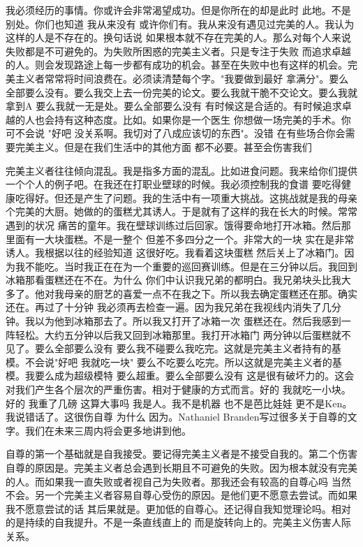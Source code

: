 我必须经历的事情。你或许会非常渴望成功。但是你所在的却是此时 此地。不是别处。你们也知道 我从来没有 或许你们有。我从来没有遇见过完美的人。我认为这样的人是不存在的。换句话说 如果根本就不存在完美的人。那么对每个人来说 失败都是不可避免的。为失败所困惑的完美主义者。只是专注于失败 而追求卓越的人。则会发现路途上每一步都有成功的机会。甚至在失败中也有这样的机会。完美主义者常常将时间浪费在。必须读清楚每个字。"我要做到最好 拿满分"。要么全部要么没有。要么我交上去一份完美的论文。要么我就干脆不交论文。要么我就拿到A 要么我就一无是处。要么全部要么没有 有时候这是合适的。有时候追求卓越的人也会持有这种态度。比如。如果你是一个医生 你想做一场完美的手术。你可不会说 "好吧 没关系啊。我切对了八成应该切的东西"。没错 在有些场合你会需要完美主义。但是在我们生活中的其他方面 都不必要。甚至会伤害我们 

完美主义者往往倾向混乱。我是指多方面的混乱。比如进食问题。我来给你们提供一个个人的例子吧。在我还在打职业壁球的时候。我必须控制我的食谱 要吃得健康吃得好。但还是产生了问题。我的生活中有一项重大挑战。这挑战就是我的母亲个完美的大厨。她做的的蛋糕尤其诱人。于是就有了这样的我在长大的时候。常常遇到的状况 痛苦的童年。我在壁球训练过后回家。饿得要命地打开冰箱。然后那里面有一大块蛋糕。不是一整个 但差不多四分之一个。非常大的一块 实在是非常诱人。我根据以往的经验知道 这很好吃。我看着这块蛋糕 然后关上了冰箱门。因为我不能吃。当时我正在在为一个重要的巡回赛训练。但是在三分钟以后。我回到冰箱那看蛋糕还在不在。为什么 你们中认识我兄弟的都明白。我兄弟块头比我大多了。他对我母亲的厨艺的喜爱一点不在我之下。所以我去确定蛋糕还在那。确实还在。再过了十分钟 我必须再去检查一遍。因为我兄弟在我视线内消失了几分钟。我以为他到冰箱那去了。所以我又打开了冰箱一次 蛋糕还在。然后我感到一阵轻松。大约五分钟以后我又回到冰箱那里。我打开冰箱门 两分钟以后蛋糕就不见了。要么全部要么没有 要么我不碰要么我吃完。这就是完美主义者持有的基模。不会说"好吧 我就吃一块" 要么不吃要么吃完。所以这就是完美主义者的基模。我要么成为超级模特 要么超重。要么全部要么没有 这是很有破坏力的。这会对我们产生各个层次的严重伤害。相对于健康的方式而言。好的 我就吃一小块。好的 我重了几磅 这算大事吗 我是人。我不是机器 也不是芭比娃娃 更不是Ken。我说错话了。这很伤自尊 为什么 因为。Nathaniel Branden写过很多关于自尊的文字。我们在未来三周内将会更多地讲到他。 

自尊的第一个基础就是自我接受。要记得完美主义者是不接受自我的。第二个伤害自尊的原因是。完美主义者总会遇到长期且不可避免的失败。因为根本就没有完美的人。而如果我一直失败或者视自己为失败者。那我还会有较高的自尊心吗 当然不会。另一个完美主义者容易自尊心受伤的原因。是他们更不愿意去尝试。而如果我不愿意尝试的话 其后果就是。更加低的自尊心。还记得自我知觉理论吗。相对的是持续的自我提升。不是一条直线直上的 而是旋转向上的。完美主义伤害人际关系。 

